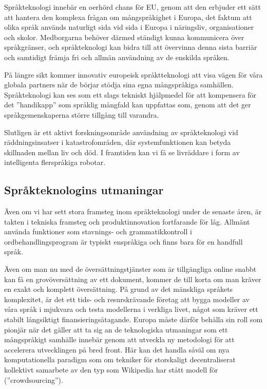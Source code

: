 \begin{multicols}{2}
Språkteknologi innebär en oerhörd chans för EU, genom att den erbjuder
ett sätt att hantera den komplexa frågan om mångspråkighet i Europa,
det faktum att olika språk används naturligt sida vid sida i Europa i
näringsliv, organisationer och skolor. Medborgarna behöver därmed
ständigt kunna kommunicera över språkgränser, och språkteknologi kan
bidra till att övervinna denna sista barriär och samtidigt främja fri
och allmän användning av de enskilda språken. 

På längre sikt kommer
innovativ europeisk språktteknologi att visa vägen för våra globala
partners när de börjar stödja sina egna mångspråkiga
samhällen. Språkteknologi kan ses som ett slags tekniskt hjälpmedel
för att kompensera för det ''handikapp'' som språklig mångfald kan
uppfattas som, genom att det ger språkgemenskaperna större tillgång
till varandra. 

Slutligen är ett aktivt forskningsområde användning av
språkteknologi vid räddningsinsatser i katastrofområden, där
systemfunktionen kan betyda skillnaden mellan liv och död. I framtiden
kan vi få se livräddare i form av intelligenta flerspråkiga robotar.

\subsection{Språkteknologins utmaningar}

Även om vi har sett stora framsteg inom språkteknologi under de
senaste åren, är takten i tekniska framsteg och produktinnovation
fortfarande för låg. Allmänt använda funktioner som stavnings- och
grammatikkontroll i ordbehandlingsprogram är typiskt enspråkiga och
finns bara för en handfull språk.


Även om man nu med de översättningstjänster som är tillgängliga online
snabbt kan få en grovöversättning av ett dokument, kommer de till
korta om man kräver en exakt och komplett översättning. På grund av
det mänskliga språkets komplexitet, är det ett tids- och
resurskrävande företag att bygga modeller av våra språk i mjukvara och
testa modellerna i verkliga livet, något som kräver ett stabilt
långsiktigt finansierings\-åtagande. Europa måste därför behålla sin
roll som pionjär när det gäller att ta sig an de teknologiska
utmaningar som ett mångspråkigt samhälle innebär genom att utveckla ny
metodologi för att accelerera utvecklingen på bred front. Här kan det
handla såväl om nya komputationella paradigm som om tekniker för
storskaligt decentraliserat kollektivt samarbete av den typ som
Wikipedia har stått modell för (''crowdsourcing'').


\end{multicols}
